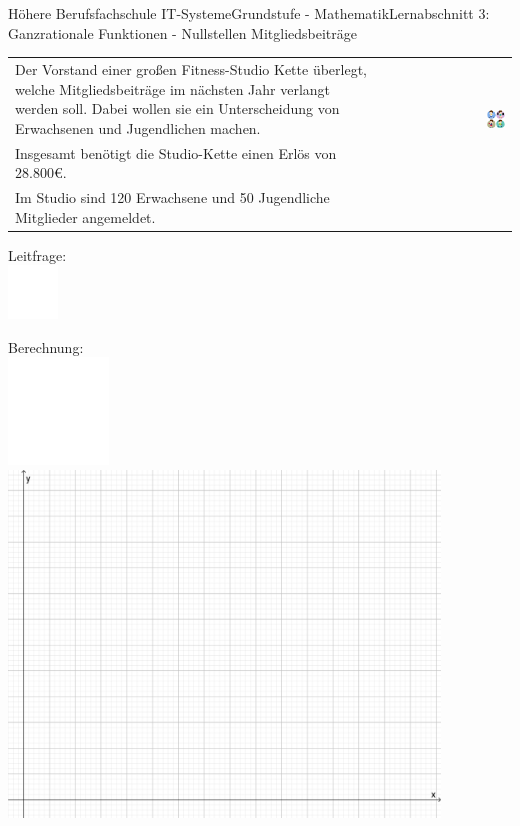 \documentclass[oneside,openany,headings=optiontotoc,11pt,numbers=noenddot]{scrreprt}
\begin{document}
\begin{worksheet}{Höhere Berufsfachschule IT-Systeme}{Grundstufe - Mathematik}{Lernabschnitt 3: Ganzrationale Funktionen - Nullstellen}
		\setcounter{page}{1}
		\noindent
		\LARGE Mitgliedsbeiträge\\
		\normalsize
		\noindent
		\begin{tabularx}{\textwidth}{Xr}
			Der Vorstand einer großen Fitness-Studio Kette überlegt, welche Mitgliedsbeiträge im nächsten Jahr verlangt werden soll. Dabei wollen sie ein Unterscheidung von Erwachsenen und Jugendlichen machen. & \multirow{2}{*}{\includegraphics[width=0.15\textwidth,align=b]{../99_Bilder/sporty.jpg}}\\
			Insgesamt benötigt die Studio-Kette einen Erlös von \(28.800\)\euro{}. & \\
			Im Studio sind 120 Erwachsene und 50 Jugendliche Mitglieder angemeldet.
		\end{tabularx}
		\begin{framed}
			\noindent
			\small{\color{codegray}Leitfrage:}\\
			\includegraphics[width=0.1\textwidth]{../../empty.jpg}\\
		\end{framed}
		\begin{framed}
			\noindent
			\small{\color{codegray}Berechnung:}\\
			\includegraphics[width=0.2\textwidth]{../../empty.jpg}\\
			\includegraphics[width=0.86\textwidth]{../99_Bilder/KoordLeer.png}

\end{framed}
\end{worksheet}
\end{document}

